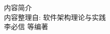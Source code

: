 \thispagestyle{empty}
\begin{titlepage}
\thispagestyle{empty}
    \begin{center}
    {\makeatletter
    \ifdefvoid{\@bookseries}{}{\bigskip\normalfont\fontsize{20}{20}\selectfont\@bookseries}
    \makeatother}
        \bigskip

        \bigskip
    {\makeatletter
    \fontsize{35}{35}\rmfamily\bfseries\selectfont\@title
    \makeatother}
    \bigskip

    \bigskip

    \bigskip

    \bigskip

    \bigskip
    {\makeatletter
    \fontsize{25}{25}\rmfamily\selectfont\@author
    \makeatother}
    \bigskip

    \bigskip

    \vfill

    \bigskip
    
    \bigskip
    {\makeatletter
    \fontsize{25}{25}\rmfamily\selectfont\@pressname
    \makeatother}
    \end{center}
    \end{titlepage}
    \let\cleardoublepage\clearpage
    \thispagestyle{empty}
    \begin{center}
        {\fontsize{20}{20}\rmfamily\selectfont    内\hspace{1em}容\hspace{1em}简\hspace{1em}介}\\ 
        \bigskip
        内容整理自:
        \bigskip
        软件架构理论与实践
        \\
        李必信 等编著
        \vfill
    \end{center}





